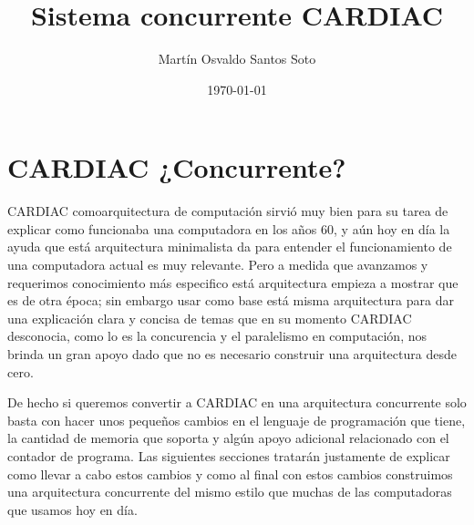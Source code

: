 \documentclass[12pt]{article}
\title{Sistema concurrente CARDIAC}
\author{Martín Osvaldo Santos Soto}
\date{\today}
\begin{document}
	\maketitle


    \section{ CARDIAC ¿Concurrente? }
    
    CARDIAC comoarquitectura de computación sirvió muy bien para su tarea de explicar como funcionaba una computadora en los años
    60, y aún hoy en día la ayuda que está arquitectura minimalista da para entender el funcionamiento de una computadora actual es muy relevante. Pero
    a medida que avanzamos y requerimos conocimiento más especifico está arquitectura empieza a mostrar que es de otra época; sin embargo usar
    como base está misma arquitectura para dar una explicación clara y concisa de temas que en su momento CARDIAC desconocia, como lo es la
    concurencia y el paralelismo en computación, nos brinda un gran apoyo dado que no es necesario construir una arquitectura desde cero.
    
    De hecho si queremos convertir a CARDIAC en una arquitectura concurrente solo basta con hacer unos pequeños cambios en el lenguaje
    de programación que tiene, la cantidad de memoria que soporta y algún apoyo adicional relacionado con el contador de programa. Las siguientes
    secciones tratarán justamente de explicar como llevar a cabo estos cambios y como al final con estos cambios construimos una arquitectura
    concurrente del mismo estilo que muchas de las computadoras que usamos hoy en día.
    

	
	
\end{document}
